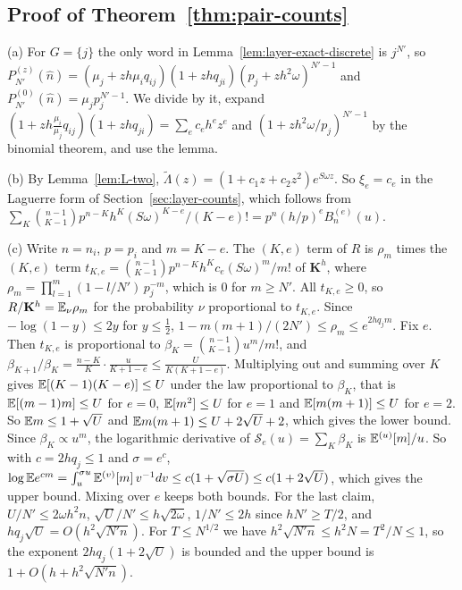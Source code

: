 \subsection{Proof of Theorem~\ref{thm:pair-counts}}

(a) For $G=\{j\}$ the only word in Lemma~\ref{lem:layer-exact-discrete} is $j^{N'}$, so
$P^{(z)}_{N'}(\hat n)=(\mu_j+zh\mu_iq_{ij})(1+zhq_{ji})(p_j+zh^2\omega)^{N'-1}$ and
$P^{(0)}_{N'}(\hat n)=\mu_jp_j^{N'-1}$. We divide by it, expand
$(1+zh\frac{\mu_i}{\mu_j}q_{ij})(1+zhq_{ji})=\sum_ec_eh^ez^e$ and $(1+zh^2\omega/p_j)^{N'-1}$ by the
binomial theorem, and use the lemma.

(b) By Lemma~\ref{lem:L-two}, $\widetilde\Lambda(z)=(1+c_1z+c_2z^2)e^{S\omega z}$. So
$\xi_e=c_e$ in the Laguerre form of Section~\ref{sec:layer-counts}, which follows from
$\sum_K\binom{n-1}{K-1}p^{n-K}h^K(S\omega)^{K-e}/(K-e)!=p^n(h/p)^eB^{(e)}_n(u)$.

(c) Write $n=n_i$, $p=p_i$ and $m=K-e$. The $(K,e)$ term of $R$ is $\rho_m$ times the $(K,e)$ term
$t_{K,e}=\binom{n-1}{K-1}p^{n-K}h^Kc_e(S\omega)^m/m!$ of $\mathbf K^h$, where
$\rho_m=\prod_{l=1}^m(1-l/N')\,p_j^{-m}$, which is $0$ for $m\ge N'$. All $t_{K,e}\ge0$, so
$R/\mathbf K^h=\mathbb{E}_\nu\rho_m$ for the probability $\nu$ proportional to $t_{K,e}$. Since
$-\log(1-y)\le2y$ for $y\le\frac12$, $1-m(m+1)/(2N')\le\rho_m\le e^{2hq_jm}$. Fix $e$. Then
$t_{K,e}$ is proportional to $\beta_K=\binom{n-1}{K-1}u^m/m!$, and
$\beta_{K+1}/\beta_K=\frac{n-K}K\cdot\frac u{K+1-e}\le\frac U{K(K+1-e)}$. Multiplying out and
summing over $K$ gives $\mathbb{E}[(K-1)(K-e)]\le U$ under the law proportional to $\beta_K$, that is
$\mathbb{E}[(m-1)m]\le U$ for $e=0$, $\mathbb{E}[m^2]\le U$ for $e=1$ and $\mathbb{E}[m(m+1)]\le U$ for $e=2$. So
$\mathbb{E} m\le1+\sqrt U$ and $\mathbb{E} m(m+1)\le U+2\sqrt U+2$, which gives the lower bound. Since
$\beta_K\propto u^m$, the logarithmic derivative of $\mathcal S_e(u)=\sum_K\beta_K$ is
$\mathbb{E}^{(u)}[m]/u$. So with $c=2hq_j\le1$ and $\sigma=e^c$,
$\log\mathbb{E} e^{cm}=\int_u^{\sigma u}\mathbb{E}^{(v)}[m]\,v^{-1}dv\le c(1+\sqrt{\sigma U})\le c(1+2\sqrt U)$,
which gives the upper bound. Mixing over $e$ keeps both bounds. For the last claim,
$U/N'\le2\omega h^2n$, $\sqrt U/N'\le h\sqrt{2\omega}$, $1/N'\le2h$ since $hN'\ge T/2$, and
$hq_j\sqrt U=O(h^2\sqrt{N'n})$. For $T\le N^{1/2}$ we have $h^2\sqrt{N'n}\le h^2N=T^2/N\le1$, so
the exponent $2hq_j(1+2\sqrt U)$ is bounded and the upper bound is $1+O(h+h^2\sqrt{N'n})$.

